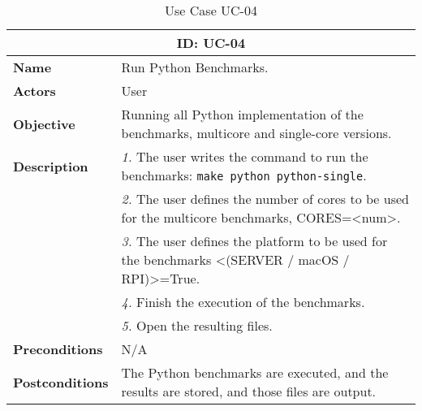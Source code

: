 \begin{table}[H]
    \centering
    \begin{tabular}{l p{10cm}}
        \toprule
        \multicolumn{2}{c}{\textbf{ID: UC-04}} \\
        \toprule
        \textbf{Name}                         &  Run Python Benchmarks. \\
        \textbf{Actors}                       &  User \\
        \textbf{Objective}                    &  Running all Python implementation of the benchmarks, multicore and single-core versions. \\
        \multirow{1}{*}{\textbf{Description}} & \textsl{1.} The user writes the command to run the benchmarks: \texttt{make python python-single}.\\
                                              & \textsl{2.} The user defines the number of cores to be used for the multicore benchmarks, CORES=<num>.\\
                                              & \textsl{3.} The user defines the platform to be used for the benchmarks <(SERVER / macOS / RPI)>=True.\\
                                              & \textsl{4.} Finish the execution of the benchmarks.\\
                                              & \textsl{5.} Open the resulting files.\\
        \textbf{Preconditions}                &  N/A \\
        \textbf{Postconditions}               &  The Python benchmarks are executed, and the results are stored, and those files are output. \\
    \end{tabular}
    \caption{Use Case UC-04}
    \label{tab:uc-04}
\end{table}


